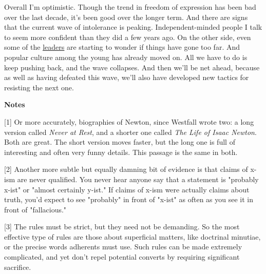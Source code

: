 Overall I'm optimistic. Though the
                  trend in freedom of expression has been bad over the last
                  decade, it's been good over the longer term. And there are
                  signs that the current wave of intolerance is peaking.
                  Independent-minded people I talk to seem more confident than
                  they did a few years ago. On the other side, even some of the
                  \href{https://www.nytimes.com/2022/03/18/opinion/cancel-culture-free-speech-poll.html}{\underline{leaders}}
                  are starting to wonder if things have gone too far. And
                  popular culture among the young has already moved on. All we
                  have to do is keep pushing back, and the wave collapses. And
                  then we'll be net ahead, because as well as having defeated
                  this wave, we'll also have developed new tactics for resisting
                  the next one.









\textbf{Notes}

[1] Or more accurately, biographies of Newton, since Westfall
                  wrote two: a long version called \emph{Never at Rest}, and a
                  shorter one called \emph{The Life of Isaac Newton}. Both are
                  great. The short version moves faster, but the long one is
                  full of interesting and often very funny details. This passage
                  is the same in both.

[2] Another more subtle but equally damning bit of evidence is
                  that claims of x-ism are never qualified. You never hear
                  anyone say that a statement is "probably x-ist" or "almost
                  certainly y-ist." If claims of x-ism were actually claims
                  about truth, you'd expect to see "probably" in front of
                  "x-ist" as often as you see it in front of "fallacious."

[3] The rules must be strict, but they need not be demanding.
                  So the most effective type of rules are those about
                  superficial matters, like doctrinal minutiae, or the precise
                  words adherents must use. Such rules can be made extremely
                  complicated, and yet don't repel potential converts by
                  requiring significant sacrifice.

